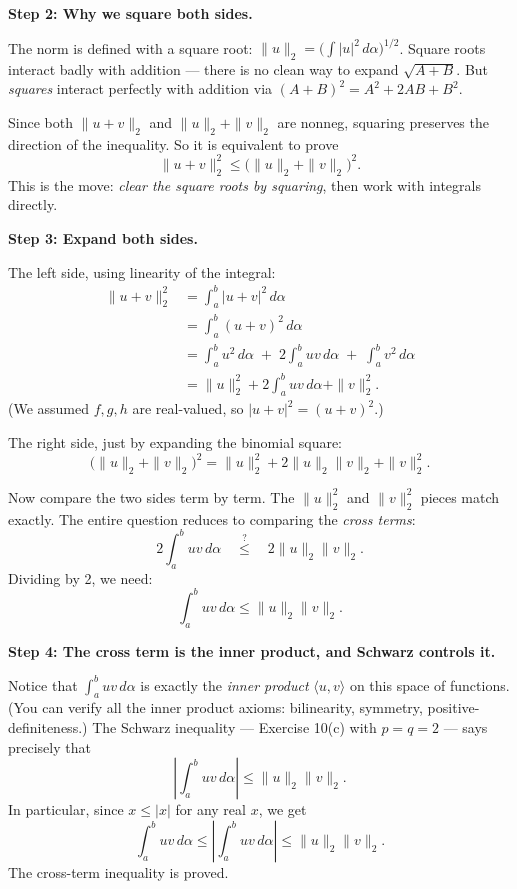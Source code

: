 \documentclass[10pt]{article}
\begin{document}
\medskip
\textbf{Step 2: Why we square both sides.}

The norm is defined with a square root: $\|u\|_2 = \bigl(\int |u|^2\,d\alpha\bigr)^{1/2}$.
Square roots interact badly with addition --- there is no clean way to expand $\sqrt{A+B}$.
But \emph{squares} interact perfectly with addition via $(A+B)^2 = A^2 + 2AB + B^2$.

Since both $\|u+v\|_2$ and $\|u\|_2 + \|v\|_2$ are nonneg, squaring preserves the direction of the inequality.
So it is equivalent to prove
$$\|u + v\|_2^2 \leq \bigl(\|u\|_2 + \|v\|_2\bigr)^2.$$
This is the move: \emph{clear the square roots by squaring}, then work with integrals directly.

\medskip
\textbf{Step 3: Expand both sides.}

The left side, using linearity of the integral:
\begin{align*}
\|u + v\|_2^2
  &= \int_a^b |u + v|^2 \, d\alpha \\
  &= \int_a^b (u + v)^2 \, d\alpha \\
  &= \int_a^b u^2 \, d\alpha \;+\; 2\int_a^b uv \, d\alpha \;+\; \int_a^b v^2 \, d\alpha \\
  &= \|u\|_2^2 + 2\int_a^b uv \, d\alpha + \|v\|_2^2.
\end{align*}
(We assumed $f,g,h$ are real-valued, so $|u+v|^2 = (u+v)^2$.)

The right side, just by expanding the binomial square:
$$\bigl(\|u\|_2 + \|v\|_2\bigr)^2 = \|u\|_2^2 + 2\|u\|_2\|v\|_2 + \|v\|_2^2.$$

Now compare the two sides term by term.
The $\|u\|_2^2$ and $\|v\|_2^2$ pieces match exactly.
The entire question reduces to comparing the \emph{cross terms}:
$$2\int_a^b uv \, d\alpha \quad \overset{?}{\leq} \quad 2\|u\|_2\|v\|_2.$$
Dividing by 2, we need:
$$\int_a^b uv \, d\alpha \leq \|u\|_2 \|v\|_2.$$

\medskip
\textbf{Step 4: The cross term is the inner product, and Schwarz controls it.}

Notice that $\int_a^b uv \, d\alpha$ is exactly the \emph{inner product} $\langle u, v\rangle$ on this space of functions.
(You can verify all the inner product axioms: bilinearity, symmetry, positive-definiteness.)
The Schwarz inequality --- Exercise 10(c) with $p = q = 2$ --- says precisely that
$$\left|\int_a^b uv \, d\alpha\right| \leq \|u\|_2 \|v\|_2.$$
In particular, since $x \leq |x|$ for any real $x$, we get
$$\int_a^b uv \, d\alpha \leq \left|\int_a^b uv \, d\alpha\right| \leq \|u\|_2 \|v\|_2.$$
The cross-term inequality is proved.
\end{document}
